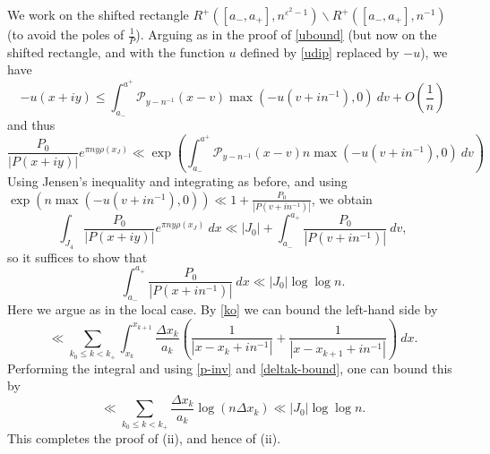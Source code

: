 \documentclass[12pt]{amsart}
\newcommand{\eps}{\varepsilon}
\newcommand{\Poisson}{\mathcal{P}}
\begin{document}
We work on the shifted rectangle $R^+([a_-,a_+], n^{\eps^2-1}) \backslash R^+([a_-,a_+], n^{-1})$ (to avoid the poles of $\frac{1}{P}$).
Arguing as in the proof of \eqref{ubound} (but now on the shifted rectangle, and with the function $u$ defined by \eqref{udip} replaced by $-u$), we have
$$ -u(x+iy) \leq \int_{a_-}^{a^+} \Poisson_{y-n^{-1}}(x-v) \max(-u(v+in^{-1}),0)\ dv + O\left(\frac{1}{n}\right)$$
and thus
$$ \frac{P_0}{|P(x+iy)|} e^{\pi n y \rho(x_J)} \ll \exp\left(\int_{a_-}^{a^+} \Poisson_{y-n^{-1}}(x-v) n\max(-u(v+in^{-1}),0)\ dv\right)$$
Using Jensen's inequality and integrating as before, and using $\exp(n\max(-u(v+in^{-1}),0)) \ll 1 + \frac{P_0}{|P(v+in^{-1})|}$, we obtain
$$ \int_{J_4} \frac{P_0}{|P(x+iy)|} e^{\pi n y \rho(x_J)}\ dx \ll |J_0| + \int_{a_-}^{a_+} \frac{P_0}{|P(v+in^{-1})|}\ dv,$$
so it suffices to show that
$$\int_{a_-}^{a_+} \frac{P_0}{|P(x+in^{-1})|}\ dx \ll |J_0| \log\log n.$$
Here we argue as in the local case.  By \eqref{ko} we can bound the left-hand side by
$$ \ll \sum_{k_0 \leq k < k_+} \int_{x_k}^{x_{k+1}} \frac{\Delta x_k}{a_k} \left( \frac{1}{|x-x_k+in^{-1}|} + \frac{1}{|x-x_{k+1}+in^{-1}|} \right)\ dx.$$
Performing the integral and using \eqref{p-inv} and \eqref{deltak-bound}, one can bound this by
$$ \ll \sum_{k_0 \leq k < k_+} \frac{\Delta x_k}{a_k} \log(n \Delta x_k) \ll |J_0| \log\log n.$$
This completes the proof of (ii), and hence of (ii).


\end{document}
